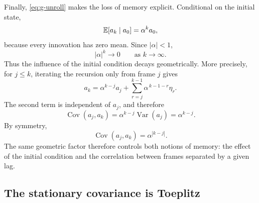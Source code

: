 Finally, \eqref{eq:g-unroll} makes the loss of memory explicit. Conditional
on the initial state,
\begin{equation}
  \mathbb{E}[a_k\mid a_0]
  =\alpha^k a_0,
  \label{eq:g-memory}
\end{equation}
because every innovation has zero mean. Since $|\alpha|<1$,
\[
  |\alpha|^k\longrightarrow0
  \qquad\text{as }k\longrightarrow\infty.
\]
Thus the influence of the initial condition decays geometrically. More
precisely, for $j\leq k$, iterating the recursion only from frame $j$ gives
\[
  a_k
  =\alpha^{k-j}a_j
   +\sum_{r=j}^{k-1}\alpha^{\,k-1-r}\eta_r.
\]
The second term is independent of $a_j$, and therefore
\begin{equation}
  \operatorname{Cov}(a_j,a_k)
  =\alpha^{k-j}\operatorname{Var}(a_j)
  =\alpha^{k-j}.
\end{equation}
By symmetry,
\begin{equation}
  \boxed{
  \operatorname{Cov}(a_j,a_k)=\alpha^{|k-j|}
  }.
  \label{eq:g-ar1-covariance}
\end{equation}
The same geometric factor therefore controls both notions of memory:
the effect of the initial condition and the correlation between frames
separated by a given lag.


\subsection{The stationary covariance is Toeplitz}

